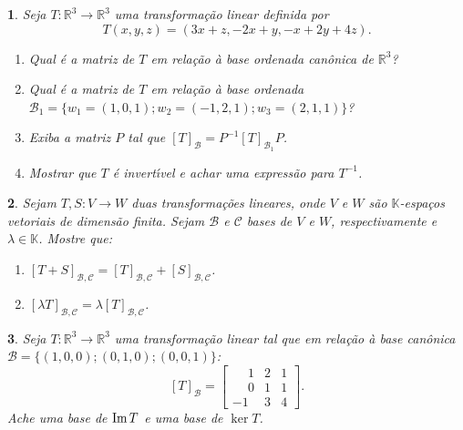 \documentclass[12pt]{exam}
\newtheorem{exercicio}{}
\newcommand{\im}{{\rm Im\,}}
\newcommand{\real}{\mathbb{R}}
\newcommand{\cp}[1]{\mathbb{#1}}
\begin{document}
\begin{exercicio}
  Seja $T : \real^3 \to \real^3$ uma transforma\c{c}\~ao linear definida por
  \[
    T(x,y,z) = (3x + z,-2x + y,-x+2y + 4z).
  \]
  \begin{enumerate}[label=({\alph*})]
    \item Qual \'e a matriz de $T$ em rela\c{c}\~ao \`a base ordenada can\^onica de $\real^3$?
    \item Qual \'e a matriz de $T$ em rela\c{c}\~ao \`a base ordenada $\mathcal{B}_1 = \{w_1 = (1,0,1); w_2 = (-1,2,1); w_3 = (2,1,1)\}$?
    \item Exiba a matriz $P$ tal que $[T]_{\mathcal{B}} = P^{-1}[T]_{\mathcal{B}_1}P$.
    \item Mostrar que $T$ \'e invert{\'\i}vel e achar uma express\~ao para $T^{-1}$.
  \end{enumerate}
\end{exercicio}

\begin{exercicio}
  Sejam $T, S : V \to W$ duas transforma\c{c}\~oes lineares, onde $V$ e $W$ s\~ao $\cp{K}$-espa\c{c}os vetoriais de dimens\~ao finita. Sejam $\mathcal{B}$ e $\mathcal{C}$ bases de $V$ e $W$, respectivamente e $\lambda \in \cp{K}$. Mostre que:
  \begin{enumerate}[label=({\alph*})]
    \item $[T + S]_{\mathcal{B}, \mathcal{C}} = [T]_{\mathcal{B}, \mathcal{C}} + [S]_{\mathcal{B}, \mathcal{C}}$.
    \item $[\lambda T]_{\mathcal{B}, \mathcal{C}} = \lambda [T]_{\mathcal{B}, \mathcal{C}}$.
  \end{enumerate}
\end{exercicio}

\begin{exercicio}
  Seja $T : \real^3 \to \real^3$ uma transforma\c{c}\~ao linear tal que em rela\c{c}\~ao \`a base can\^onica $\mathcal{B} = \{(1,0,0); (0,1,0); (0,0,1)\}$:
  \[
    [T]_\mathcal{B} =\begin{bmatrix}
      \phantom{-}1 & 2 & 1\\
      \phantom{-} 0 & 1 & 1\\
      -1 & 3 & 4
    \end{bmatrix}.
  \]
  Ache uma base de $\im T$ e uma base de $\ker T$.
\end{exercicio}
\end{document}
